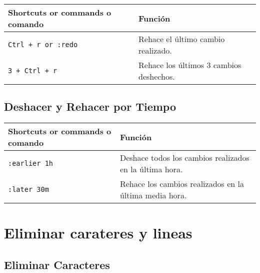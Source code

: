 \documentclass[
  doc,
  floatsintext,
  longtable,
  a4paper,
  nolmodern,
  notxfonts,
  notimes,
  colorlinks=true,linkcolor=blue,citecolor=blue,urlcolor=blue]{apa7}
\begin{document}
\begin{longtable}[]{@{}
  >{\raggedright\arraybackslash}p{}
  >{\raggedright\arraybackslash}p{}@{}}
\toprule\noalign{}
\begin{minipage}[b]{\linewidth}\raggedright
Shortcuts or commands o comando
\end{minipage} & \begin{minipage}[b]{\linewidth}\raggedright
Función
\end{minipage} \\
\midrule\noalign{}
\endhead
\bottomrule\noalign{}
\endlastfoot
\texttt{Ctrl\ +\ r\ or\ :redo} & Rehace el último cambio realizado. \\
\texttt{3\ +\ Ctrl\ +\ r} & Rehace los últimos 3 cambios deshechos. \\
\end{longtable}

\subsection{Deshacer y Rehacer por
Tiempo}\label{deshacer-y-rehacer-por-tiempo}

\begin{longtable}[]{@{}
  >{\raggedright\arraybackslash}p{}
  >{\raggedright\arraybackslash}p{}@{}}
\toprule\noalign{}
\begin{minipage}[b]{\linewidth}\raggedright
Shortcuts or commands o comando
\end{minipage} & \begin{minipage}[b]{\linewidth}\raggedright
Función
\end{minipage} \\
\midrule\noalign{}
\endhead
\bottomrule\noalign{}
\endlastfoot
\texttt{:earlier\ 1h} & Deshace todos los cambios realizados en la
última hora. \\
\texttt{:later\ 30m} & Rehace los cambios realizados en la última media
hora. \\
\end{longtable}

\section{Eliminar carateres y lineas}\label{eliminar-carateres-y-lineas}

\subsection{Eliminar Caracteres}\label{eliminar-caracteres}
\end{document}
